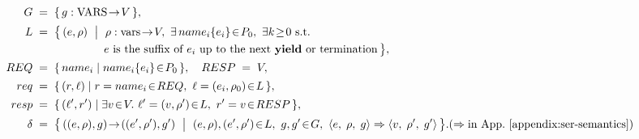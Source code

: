 \[
\begin{aligned}
	G \;&=\; \{\, g : \text{VARS}\!\to\! V \,\},\\[0.3ex]
	L \;&=\; \bigl\{\, (e,\rho)\ \bigm|\ \rho:\text{vars}\!\to\! V,\ \exists\,name_i\{e_i\}\!\in\! P_0,\ \exists k\!\ge\!0\ \text{s.t.} \\[-0.2ex]
	&\qquad\quad\qquad\quad e \text{ is the suffix of } e_i \text{ up to the next } \yieldkw \text{ or termination} \,\bigr\},\\[0.3ex]
	REQ \;&=\; \{\, name_i \mid name_i\{e_i\}\!\in\! P_0 \,\},\quad RESP \;=\; V,\\[0.3ex]
	req \;&=\; \{\, (r,\ell) \mid r=name_i\!\in\!REQ,\ \ell=(e_i,\rho_0)\!\in\!L \,\},\\[0.3ex]
	resp \;&=\; \{\, (\ell',r') \mid \exists v\!\in\!V.\ \ell'=(v,\rho')\!\in\!L,\ r'=v\!\in\!RESP \,\},\\[0.3ex]
	\delta \;&=\; \bigl\{\, ((e,\rho),g)\!\to\!((e',\rho'),g') \ \bigm|\ (e,\rho),(e',\rho')\!\in\!L,\ g,g'\!\in\!G,\ 
	\cfg{e}{\rho}{g} \pstep \cfg{v}{\rho'}{g'} \,\bigr\}.
	(\pstep \text{in App.}~\ref{appendix:ser-semantics})
\end{aligned}
\]


%
%	
%
%	
%	
%	
%	
%	
%




